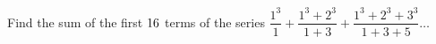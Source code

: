 
%
%
%
%      
% 
% 
%   



\question Find the sum of the first $16$ terms of the series $\dfrac{1^3}{1} + \dfrac{1^3+2^3}{1+3} + \dfrac{1^3+2^3+3^3}{1+3+5}\ldots$

\insertQR{}

\watchout

\ifprintanswers
\fi 

